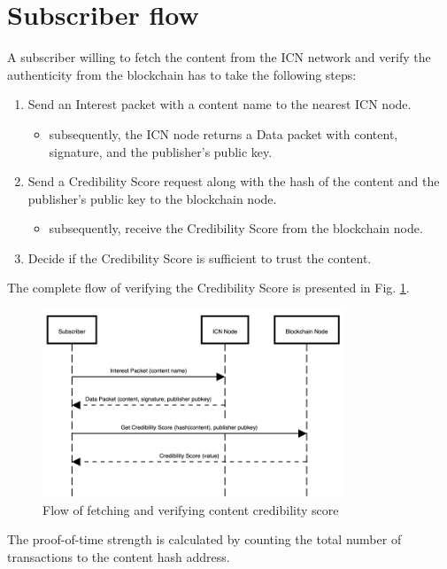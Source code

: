 \section{Subscriber flow}
A subscriber willing to fetch the content from the ICN network and verify the authenticity from the blockchain has to take the following steps:
\begin{enumerate}
    \item Send an Interest packet with a content name to the nearest ICN node.
    \begin{itemize}
        \item subsequently, the ICN node returns a Data packet with content, signature, and the publisher's public key.
    \end{itemize}
    \item Send a Credibility Score request along with the hash of the content and the publisher's public key to the blockchain node.
    \begin{itemize}
        \item subsequently, receive the Credibility Score from the blockchain node.
    \end{itemize}
    \item Decide if the Credibility Score is sufficient to trust the content.
\end{enumerate}
The complete flow of verifying the Credibility Score is presented in Fig. \ref{fig:verifying-flow}.
\begin{figure}[h!]
\includegraphics[width=9cm]{img/verifying-flow.png}
\centering
\caption{Flow of fetching and verifying content credibility score}
\label{fig:verifying-flow}
\end{figure} 

The proof-of-time strength is calculated by counting the total number of transactions to the content hash address.

